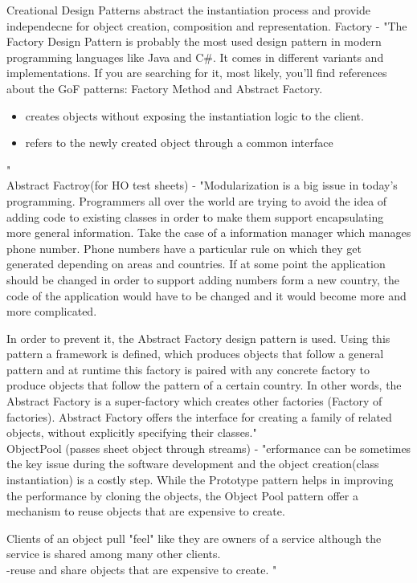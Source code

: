 \documentclass{llncs}
\begin{document}
Creational Design Patterns abstract the instantiation process and provide independecne for object creation, composition and representation. 
Factory - "The Factory Design Pattern is probably the most used design pattern in modern programming languages like Java and C\#. It comes in different variants and implementations. If you are searching for it, most likely, you'll find references about the GoF patterns: Factory Method and Abstract Factory.
\begin{itemize}
\item creates objects without exposing the instantiation logic to the client.
\item refers to the newly created object through a common interface
\end{itemize}"\cite{oosite}\\


Abstract Factroy(for HO test sheets) - "Modularization is a big issue in today's programming. Programmers all over the world are trying to avoid the idea of adding code to existing classes in order to make them support encapsulating more general information. Take the case of a information manager which manages phone number. Phone numbers have a particular rule on which they get generated depending on areas and countries. If at some point the application should be changed in order to support adding numbers form a new country, the code of the application would have to be changed and it would become more and more complicated.

In order to prevent it, the Abstract Factory design pattern is used. Using this pattern a framework is defined, which produces objects that follow a general pattern and at runtime this factory is paired with any concrete factory to produce objects that follow the pattern of a certain country. In other words, the Abstract Factory is a super-factory which creates other factories (Factory of factories).
Abstract Factory offers the interface for creating a family of related objects, without explicitly specifying their classes."\cite{oosite}\\

ObjectPool (passes sheet object through streams) - "erformance can be sometimes the key issue during the software development and the object creation(class instantiation) is a costly step. While the Prototype pattern helps in improving the performance by cloning the objects, the Object Pool pattern offer a mechanism to reuse objects that are expensive to create. 

Clients of an object pull "feel" like they are owners of a service although the service is shared among many other clients.\\
-reuse and share objects that are expensive to create.
"\cite{oosite}\\
\end{document}
